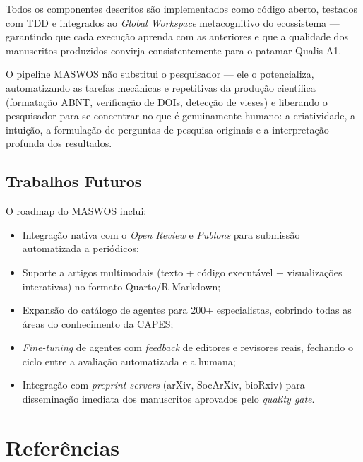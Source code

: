 Todos os componentes descritos são implementados como código
aberto, testados com TDD e integrados ao \textit{Global Workspace}
metacognitivo do ecossistema — garantindo que cada execução aprenda
com as anteriores e que a qualidade dos manuscritos produzidos
convirja consistentemente para o patamar Qualis A1.

O pipeline MASWOS não substitui o pesquisador — ele o potencializa,
automatizando as tarefas mecânicas e repetitivas da produção
científica (formatação ABNT, verificação de DOIs, detecção de
vieses) e liberando o pesquisador para se concentrar no que é
genuinamente humano: a criatividade, a intuição, a formulação de
perguntas de pesquisa originais e a interpretação profunda dos
resultados.

\subsection{Trabalhos Futuros}
\label{sec:trabalhos_futuros}

O roadmap do MASWOS inclui:

\begin{itemize}
    \item Integração nativa com o \textit{Open Review} e
    \textit{Publons} para submissão automatizada a periódicos;

    \item Suporte a artigos multimodais (texto + código executável
    + visualizações interativas) no formato Quarto/R Markdown;

    \item Expansão do catálogo de agentes para 200+ especialistas,
    cobrindo todas as áreas do conhecimento da CAPES;

    \item \textit{Fine-tuning} de agentes com \textit{feedback} de
    editores e revisores reais, fechando o ciclo entre a avaliação
    automatizada e a humana;

    \item Integração com \textit{preprint servers} (arXiv, SocArXiv,
    bioRxiv) para disseminação imediata dos manuscritos aprovados
    pelo \textit{quality gate}.
\end{itemize}

\section{Referências}
\label{sec:referencias}


